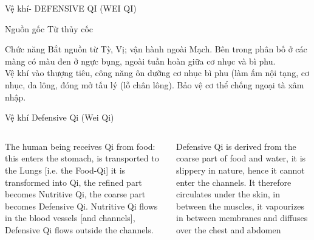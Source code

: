 \documentclass[
	11pt, %
]{beamer}
\theoremstyle{newblock}
\begin{document}
\begin{frame}{Vệ khí- DEFENSIVE QI (WEI QI)}
	\begin{block}{Nguồn gốc}
		Từ thủy cốc
	\end{block}
	\begin{block}{Chức năng}
		Bắt nguồn từ Tỳ, Vị; vận hành ngoài Mạch. Bên trong phân bố ở các màng có màu đen ở ngực bụng, ngoài tuần hoàn giữa cơ nhục và bì phu.\\
Vệ khí vào thượng tiêu, công năng ôn dưỡng cơ nhục bì phu (làm ấm nội tạng, cơ nhục, da lông, đóng mở tấu lý (lỗ chân lông). Bảo vệ cơ thể chống ngoại tà xâm nhập.
	\end{block}
\end{frame}
\begin{frame}{Vệ khí Defensive Qi (Wei Qi)}
	\begin{columns}[T]
		\begin{block}{}
			The human 
being receives Qi from food: this enters the stomach, is 
transported to the Lungs [i.e. the Food-Qi] it is transformed into Qi, the refined part becomes Nutritive Qi, the 
coarse part becomes Defensive Qi. Nutritive Qi flows in 
the blood vessels [and channels], Defensive Qi flows outside 
the channels.
		\end{block}
		\begin{block}{}
			Defensive 
Qi is derived from the coarse part of food and water, it is 
slippery in nature, hence it cannot enter the channels. It 
therefore circulates under the skin, in between the muscles, 
it vapourizes in between membranes and diffuses over the 
chest and abdomen
		\end{block}
\end{columns}
\end{frame}
\end{document}
